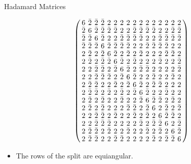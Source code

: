 \documentclass{beamer}
\begin{document}
\begin{frame}{Hadamard Matrices}

  \[
    \arraycolsep=2.0pt\def\arraystretch{0.75}
    \left(
      \begin{array}{cccccccccccccccc}
        6&\bar{2}&\bar{2}&\bar{2}&2&2&2&2&2&2&2&2&2&2&2&2\\
        \bar{2}&6&\bar{2}&\bar{2}&\bar{2}&\bar{2}&2&2&\bar{2}&\bar{2}&\bar{2}&\bar{2}&2&2&\bar{2}&\bar{2}\\
        \bar{2}&\bar{2}&6&\bar{2}&2&2&\bar{2}&\bar{2}&\bar{2}&\bar{2}&2&2&\bar{2}&\bar{2}&\bar{2}&\bar{2}\\
        \bar{2}&\bar{2}&\bar{2}&6&\bar{2}&\bar{2}&\bar{2}&\bar{2}&2&2&\bar{2}&\bar{2}&\bar{2}&\bar{2}&2&2\\
        2&\bar{2}&2&\bar{2}&6&\bar{2}&2&\bar{2}&2&\bar{2}&2&2&2&\bar{2}&\bar{2}&2\\
        2&\bar{2}&2&\bar{2}&\bar{2}&6&\bar{2}&2&\bar{2}&2&2&2&\bar{2}&2&2&\bar{2}\\
        2&2&\bar{2}&\bar{2}&2&\bar{2}&6&\bar{2}&2&\bar{2}&\bar{2}&2&2&2&2&\bar{2}\\
        2&2&\bar{2}&\bar{2}&\bar{2}&2&\bar{2}&6&\bar{2}&2&2&\bar{2}&2&2&\bar{2}&2\\
        2&\bar{2}&\bar{2}&2&2&\bar{2}&2&\bar{2}&6&\bar{2}&2&\bar{2}&\bar{2}&2&2&2\\
        2&\bar{2}&\bar{2}&2&\bar{2}&2&\bar{2}&2&\bar{2}&6&\bar{2}&2&2&\bar{2}&2&2\\
        2&\bar{2}&2&\bar{2}&2&2&\bar{2}&2&2&\bar{2}&6&\bar{2}&\bar{2}&2&\bar{2}&2\\
        2&\bar{2}&2&\bar{2}&2&2&2&\bar{2}&\bar{2}&2&\bar{2}&6&2&\bar{2}&2&\bar{2}\\
        2&2&\bar{2}&\bar{2}&2&\bar{2}&2&2&\bar{2}&2&\bar{2}&2&6&\bar{2}&\bar{2}&2\\
        2&2&\bar{2}&\bar{2}&\bar{2}&2&2&2&2&\bar{2}&2&\bar{2}&\bar{2}&6&2&\bar{2}\\
        2&\bar{2}&\bar{2}&2&\bar{2}&2&2&\bar{2}&2&2&\bar{2}&2&\bar{2}&2&6&\bar{2}\\
        2&\bar{2}&\bar{2}&2&2&\bar{2}&\bar{2}&2&2&2&2&\bar{2}&2&\bar{2}&\bar{2}&6\\
      \end{array}
    \right)
  \]

  \begin{itemize}
    \item The rows of the split are equiangular.
  \end{itemize}
  
\end{frame}
\end{document}

